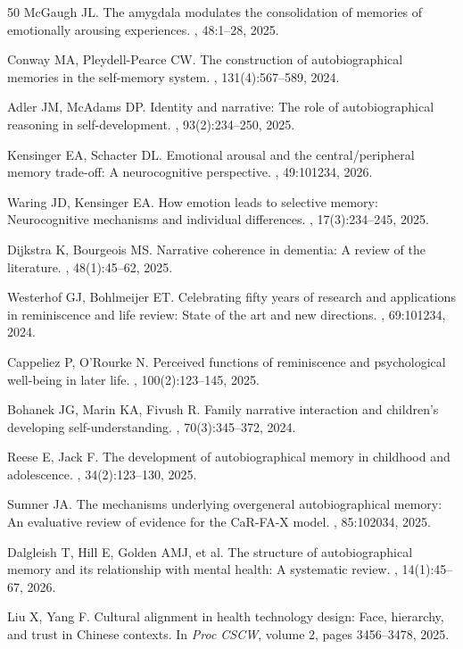 \documentclass{article}
\begin{document}
\begin{thebibliography}{50}
McGaugh JL.
\newblock The amygdala modulates the consolidation of memories of emotionally arousing experiences.
, 48:1--28, 2025.

Conway MA, Pleydell-Pearce CW.
\newblock The construction of autobiographical memories in the self-memory system.
, 131(4):567--589, 2024.

Adler JM, McAdams DP.
\newblock Identity and narrative: The role of autobiographical reasoning in self-development.
, 93(2):234--250, 2025.

Kensinger EA, Schacter DL.
\newblock Emotional arousal and the central/peripheral memory trade-off: A neurocognitive perspective.
, 49:101234, 2026.

Waring JD, Kensinger EA.
\newblock How emotion leads to selective memory: Neurocognitive mechanisms and individual differences.
, 17(3):234--245, 2025.

Dijkstra K, Bourgeois MS.
\newblock Narrative coherence in dementia: A review of the literature.
, 48(1):45--62, 2025.

Westerhof GJ, Bohlmeijer ET.
\newblock Celebrating fifty years of research and applications in reminiscence and life review: State of the art and new directions.
, 69:101234, 2024.

Cappeliez P, O'Rourke N.
\newblock Perceived functions of reminiscence and psychological well-being in later life.
, 100(2):123--145, 2025.

Bohanek JG, Marin KA, Fivush R.
\newblock Family narrative interaction and children's developing self-understanding.
, 70(3):345--372, 2024.

Reese E, Jack F.
\newblock The development of autobiographical memory in childhood and adolescence.
, 34(2):123--130, 2025.

Sumner JA.
\newblock The mechanisms underlying overgeneral autobiographical memory: An evaluative review of evidence for the CaR-FA-X model.
, 85:102034, 2025.

Dalgleish T, Hill E, Golden AMJ, et al.
\newblock The structure of autobiographical memory and its relationship with mental health: A systematic review.
, 14(1):45--67, 2026.

Liu X, Yang F.
\newblock Cultural alignment in health technology design: Face, hierarchy, and trust in Chinese contexts.
\newblock In {\em Proc CSCW}, volume 2, pages 3456--3478, 2025.

\end{thebibliography}
\end{document}
